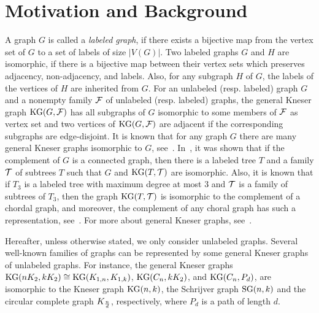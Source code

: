 \documentclass[11pt]{article}
\begin{document}
\section{Motivation and Background}
A graph $G$ is called a {\it labeled graph}, if there exists a bijective map from 
the vertex set of $G$ to a set of labels of size $|V(G)|$. Two labeled graphs  $G$ and $H$ are isomorphic, if 
there is a bijective map between their vertex sets which preserves adjacency, 
non-adjacency, and labels. Also, 
for any subgraph $H$ of $G$, the labels of the vertices of $H$ are inherited from $G$. 
For an unlabeled (resp. labeled) graph $G$  and a nonempty family ${\cal F}$ of unlabeled (resp. labeled) graphs, 
the general Kneser graph ${\rm KG}(G, {\cal F})$ has all subgraphs of $G$ isomorphic to some members of ${\cal F}$ as vertex set and two vertices of ${\rm KG}(G, {\cal F})$ are adjacent 
if the corresponding subgraphs are edge-disjoint. 
It is known that for any graph $G$ there are many general Kneser graphs isomorphic to $G$, 
see~\cite{2013arXiv1302.5394A, 2014arXiv1401.0138A}. 
In~\cite{MR2117355}, it was shown that if the complement of $G$ is a connected graph, then there is a labeled tree $T$ and a family ${\cal T}$ of subtrees $T$ such that $G$ and ${\rm KG}(T, {\cal T})$ are isomorphic. Also, it is known that if $T_3$ is a labeled tree with maximum degree at most $3$ and ${\cal T}$ is a family of 
subtrees of $T_3$, then the graph 
${\rm KG}(T, {\cal T})$
is isomorphic to the complement of a chordal graph, and moreover, the complement of any choral graph has
such a representation, see~\cite{MR2117355}. For more about general Kneser graphs, see~\cite{2013arXiv1302.5394A, 2014arXiv1401.0138A, 2014arXiv1403.4404A}. 


Hereafter, unless otherwise stated, we only consider unlabeled graphs. Several well-known families of graphs can be represented by some general Kneser graphs of unlabeled graphs. For instance, the general Kneser graphs ${\rm KG}(nK_2, kK_2)\cong{\rm KG}(K_{1,n}, K_{1,k})$, ${\rm KG}(C_n, kK_2)$, and ${\rm KG}(C_n, P_{d})$,  
are isomorphic to the Kneser graph ${\rm KG}(n, k)$, the Schrijver graph ${\rm SG}(n, k)$ and the circular complete graph $K_{n\over d}$, respectively, where $P_{d}$ is a path of length $d$.  
\end{document}

